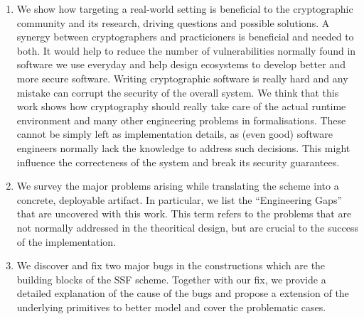 \begin{enumerate}
    \item We show how targeting a real-world setting is beneficial to the cryptographic community and its research, driving questions and possible solutions. A synergy between cryptographers and practicioners is beneficial and needed to both. It would help to reduce the number of vulnerabilities normally found in software we use everyday and help design ecosystems to develop better and more secure software. Writing cryptographic software is really hard and any mistake can corrupt the security of the overall system. We think that this work shows how cryptography should really take care of the actual runtime environment and many other engineering problems in formalisations. These cannot be simply left as implementation details, as (even good) software engineers normally lack the knowledge to address such decisions. This might influence the correcteness of the system and break its security guarantees.
    \item We survey the major problems arising while translating the scheme into a concrete, deployable artifact. In particular, we list the ``Engineering Gaps'' that are uncovered with this work. This term refers to the problems that are not normally addressed in the theoritical design, but are crucial to the success of the implementation.
    \item We discover and fix two major bugs in the constructions which are the building blocks of the SSF scheme. Together with our fix, we provide a detailed explanation of the cause of the bugs and propose a extension of the underlying primitives to better model and cover the problematic cases.
\end{enumerate}

